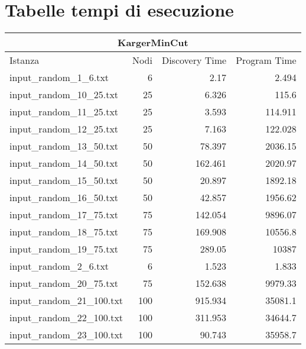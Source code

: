 \appendix
\section{Tabelle tempi di esecuzione}
\label{cap:runtime-tables}

\begin{table}[H]
    \centering

    \begin{tabular}{lrrr}
     \hline
     \multicolumn{4}{c}{KargerMinCut} \\
     \hline
     Istanza                    &   Nodi &   Discovery Time  &   Program Time \\
     \hline
     input\_random\_1\_6.txt    &       6 &            2.17  &          2.494 \\
     input\_random\_10\_25.txt  &      25 &            6.326 &        115.6   \\
     input\_random\_11\_25.txt  &      25 &            3.593 &        114.911 \\
     input\_random\_12\_25.txt  &      25 &            7.163 &        122.028 \\
     input\_random\_13\_50.txt  &      50 &           78.397 &       2036.15  \\
     input\_random\_14\_50.txt  &      50 &          162.461 &       2020.97  \\
     input\_random\_15\_50.txt  &      50 &           20.897 &       1892.18  \\
     input\_random\_16\_50.txt  &      50 &           42.857 &       1956.62  \\
     input\_random\_17\_75.txt  &      75 &          142.054 &       9896.07  \\
     input\_random\_18\_75.txt  &      75 &          169.908 &      10556.8   \\
     input\_random\_19\_75.txt  &      75 &          289.05  &      10387     \\
     input\_random\_2\_6.txt    &       6 &            1.523 &          1.833 \\
     input\_random\_20\_75.txt  &      75 &          152.638 &       9979.33  \\
     input\_random\_21\_100.txt &     100 &          915.934 &      35081.1   \\
     input\_random\_22\_100.txt &     100 &          311.953 &      34644.7   \\
     input\_random\_23\_100.txt &     100 &           90.743 &      35958.7   \\

\end{tabular}
\end{table}
